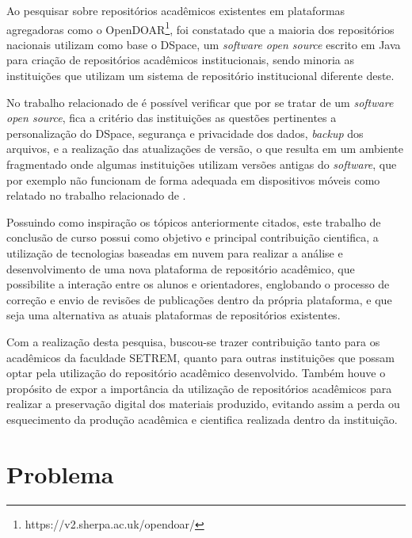 Ao pesquisar sobre repositórios acadêmicos existentes em plataformas
agregadoras como o OpenDOAR\footnote{https://v2.sherpa.ac.uk/opendoar/},
foi constatado que a maioria dos repositórios nacionais utilizam como
base o DSpace, um \emph{software open source} escrito em Java para
criação de repositórios acadêmicos institucionais,
sendo minoria as instituições que utilizam um sistema de repositório
institucional diferente deste.

No trabalho relacionado de \cite{2019:RodrigoMoreira} é possível
verificar que por se tratar de um \emph{software open source},
fica a critério das instituições as questões pertinentes a personalização
do DSpace, segurança e privacidade dos dados, \emph{backup} dos arquivos,
e a realização das atualizações de versão, o que resulta em um ambiente
fragmentado onde algumas instituições utilizam versões antigas do \emph{software},
que por exemplo não funcionam de forma adequada em dispositivos móveis como
relatado no trabalho relacionado de \cite{2019:FernandesMacedes}.

Possuindo como inspiração os tópicos anteriormente citados,
este trabalho de conclusão de curso possui como objetivo e principal
contribuição cientifica, a utilização de tecnologias baseadas em
nuvem para realizar a análise e desenvolvimento de uma nova plataforma
de repositório acadêmico, que possibilite a interação entre os alunos
e orientadores, englobando o processo de correção e envio de revisões
de publicações dentro da própria plataforma, e que seja uma alternativa
as atuais plataformas de repositórios existentes.

Com a realização desta pesquisa, buscou-se trazer contribuição
tanto para os acadêmicos da faculdade SETREM, quanto para outras
instituições que possam optar pela utilização do repositório
acadêmico desenvolvido. Também houve o propósito de expor a
importância da utilização de repositórios acadêmicos para realizar
a preservação digital dos materiais produzido, evitando assim a perda
ou esquecimento da produção acadêmica e cientifica realizada dentro
da instituição.


\section{Problema} \label{sec::Problem}

